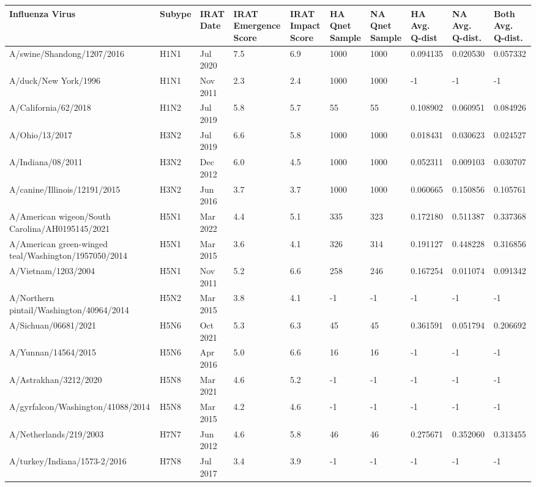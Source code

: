 \begin{tabular}{L{1.9in}|L{.35in}|L{.35in}|L{.35in}|L{.35in}|L{.35in}|L{.35in}|L{.42in}|L{.42in}|L{.42in}}\hline
Influenza Virus & Subype & IRAT Date &IRAT Emergence Score &IRAT Impact Score &HA Qnet Sample &NA Qnet Sample &HA Avg. Q-dist &NA Avg. Q-dist. &Both Avg. Q-dist. \\\hline
A/swine/Shandong/1207/2016 & H1N1 & Jul 2020 & 7.5 &6.9 & 1000 &1000 &0.094135 &0.020530 &0.057332 \\\hline
A/duck/New York/1996 & H1N1 & Nov 2011 & 2.3 &2.4 & 1000 &1000 & -1 & -1 & -1 \\\hline
A/California/62/2018 & H1N2 & Jul 2019 & 5.8 &5.7 &55 &55 &0.108902 &0.060951 &0.084926 \\\hline
A/Ohio/13/2017 & H3N2 & Jul 2019 & 6.6 &5.8 & 1000 &1000 &0.018431 &0.030623 &0.024527 \\\hline
A/Indiana/08/2011 & H3N2 & Dec 2012 & 6.0 &4.5 & 1000 &1000 &0.052311 &0.009103 &0.030707 \\\hline
A/canine/Illinois/12191/2015 & H3N2 & Jun 2016 & 3.7 &3.7 &1000 &1000 &0.060665 &0.150856 &0.105761 \\\hline
A/American wigeon/South Carolina/AH0195145/2021 & H5N1 & Mar 2022 & 4.4 &5.1 & 335 & 323 &0.172180 &0.511387 &0.337368 \\\hline
A/American green-winged teal/Washington/1957050/2014 & H5N1 & Mar 2015 & 3.6 &4.1 &326 & 314 &0.191127 &0.448228 &0.316856 \\\hline
A/Vietnam/1203/2004 & H5N1 & Nov 2011 & 5.2 &6.6 & 258 & 246 &0.167254 &0.011074 &0.091342 \\\hline
A/Northern pintail/Washington/40964/2014 & H5N2 & Mar 2015 & 3.8 &4.1 & -1 &-1 & -1 & -1 & -1 \\\hline
A/Sichuan/06681/2021 & H5N6 & Oct 2021 & 5.3 &6.3 &45 &45 &0.361591 &0.051794 &0.206692 \\\hline
A/Yunnan/14564/2015 & H5N6 & Apr 2016 & 5.0 &6.6 & 16 &16 & -1 & -1 & -1 \\\hline
A/Astrakhan/3212/2020 & H5N8 & Mar 2021 & 4.6 &5.2 &-1 &-1 & -1 & -1 & -1 \\\hline
A/gyrfalcon/Washington/41088/2014 & H5N8 & Mar 2015 & 4.2 &4.6 &-1 &-1 & -1 & -1 & -1 \\\hline
A/Netherlands/219/2003 & H7N7 & Jun 2012 & 4.6 &5.8 &46 &46 &0.275671 &0.352060 &0.313455 \\\hline
A/turkey/Indiana/1573-2/2016 & H7N8 & Jul 2017 & 3.4 &3.9 &-1 &-1 & -1 & -1 & -1 \\\hline

\end{tabular}
